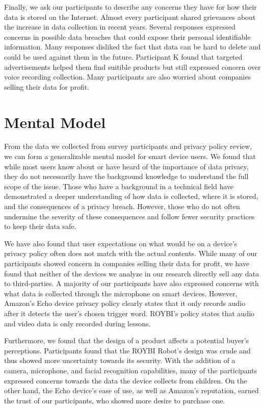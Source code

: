 \documentclass[12pt]{ucthesis}
\begin{document}
Finally, we ask our participants to describe any concerns they have for how their data is stored on the Internet. Almost every participant shared grievances about the increase in data collection in recent years. Several responses expressed concerns in possible data breaches that could expose their personal identifiable information. Many responses disliked the fact that data can be hard to delete and could be used against them in the future. Participant K found that targeted advertisements helped them find suitible products but still expressed concern over voice recording collection. Many participants are also worried about companies selling their data for profit.

\section{Mental Model}
From the data we collected from survey participants and privacy policy review, we can form a generalizable mental model for smart device users. We found that while most users know about or have heard of the importance of data privacy, they do not necessarily have the background knowledge to understand the full scope of the issue. Those who have a background in a technical field have demonstrated a deeper understanding of how data is collected, where it is stored, and the consequences of a privacy breach. However, those who do not often undermine the severity of these consequences and follow fewer security practices to keep their data safe.

We have also found that user expectations on what would be on a device's privacy policy often does not match with the actual contents. While many of our participants showed concern in companies selling their data for profit, we have found that neither of the devices we analyze in our research directly sell any data to third-parties. A majority of our participants have also expressed concerns with what data is collected through the microphone on smart devices. However, Amazon's Echo device privacy policy clearly states that it only records audio after it detects the user's chosen trigger word. ROYBI's policy states that audio and video data is only recorded during lessons.

Furthermore, we found that the design of a product affects a potential buyer's perceptions. Participants found that the ROYBI Robot's design was crude and thus showed more uncertainty towards its security. With the addition of a camera, microphone, and facial recognition capabilities, many of the participants expressed concerns towards the data the device collects from children. On the other hand, the Echo device's ease of use, as well as Amazon's reputation, earned the trust of our participants, who showed more desire to purchase one.
\end{document}
